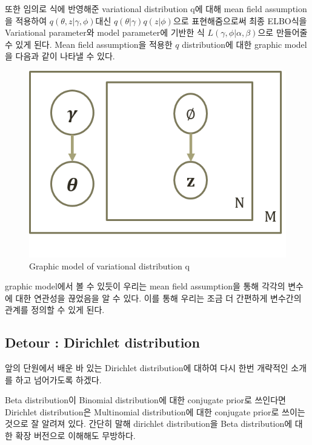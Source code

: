 \documentclass[draft=false]{oblivoir}
\begin{document}
또한 임의로 식에 반영해준 variational distribution q에 대해 mean field assumption 을 적용하여 $q(\theta,z|\gamma,\phi)$대신  $q(\theta|\gamma)q(z|\phi)$으로 표현해줌으로써 최종 ELBO식을 Variational parameter와 model parameter에 기반한 식 $L(\gamma,\phi|\alpha,\beta)$으로 만들어줄 수 있게 된다. Mean field assumption을 적용한 $q$ distribution에 대한 graphic model을 다음과 같이 나타낼 수 있다.

\begin{figure}[ht] \centering 
\includegraphics[scale=0.7]{fig11_12.png} 
\caption{Graphic model of variational distribution q}
\label{fig:11-12}
\end{figure}

graphic model에서 볼 수 있듯이 우리는 mean field assumption을 통해 
각각의 변수에 대한 연관성을 끊었음을 알 수 있다. 이를 통해 우리는 조금 더 간편하게 변수간의 관계를 정의할 수 있게 된다. 

\subsection{Detour : Dirichlet distribution}
앞의 단원에서 배운 바 있는 Dirichlet distribution에 대하여 다시 한번 개략적인 소개를 하고 넘어가도록 하겠다. 

Beta distribution이 Binomial distribution에 대한 conjugate prior로 쓰인다면 Dirichlet distribution은 Multinomial distribution에 대한 conjugate prior로 쓰이는 것으로 잘 알려져 있다. 간단히 말해 dirichlet distribution을 Beta distribution에 대한 확장 버전으로 이해해도 무방하다.
\end{document}
